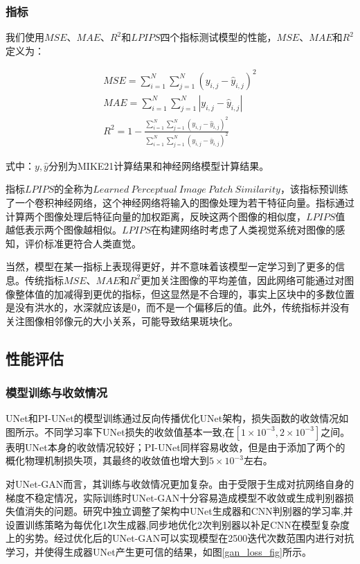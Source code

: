 \documentclass[12pt, a4paper]{article}
\begin{document}
\subsubsection{指标}

我们使用$MSE$、$MAE$、$R^2$和$LPIPS$四个指标测试模型的性能，$MSE$、$MAE$和$R^2$定义为：

\begin{align}
MSE=\sum_{i=1}^{N}\sum_{j=1}^{N}(y_{i,j}-\hat{y}_{i,j})^2 \\
MAE=\sum_{i=1}^{N}\sum_{j=1}^{N}|y_{i,j}-\hat{y}_{i,j}| \\
R^2= 1-\frac{\sum_{i=1}^{N}\sum_{j=1}^{N}(y_{i,j}-\hat{y}_{i,j})^2}{\sum_{i=1}^{N}\sum_{j=1}^{N}(y_{i,j}-\overline{y}_{i,j})^2}
\end{align}

式中：$y,\hat{y}$分别为MIKE21计算结果和神经网络模型计算结果。

指标$LPIPS$的全称为$Learned\ Perceptual\ Image\ Patch\ Similarity$，该指标预训练了一个卷积神经网络，这个神经网络将输入的图像处理为若干特征向量。指标通过计算两个图像处理后特征向量的加权距离，反映这两个图像的相似度，$LPIPS$值越低表示两个图像越相似。$LPIPS$在构建网络时考虑了人类视觉系统对图像的感知，评价标准更符合人类直觉。

当然，模型在某一指标上表现得更好，并不意味着该模型一定学习到了更多的信息。传统指标$MSE$、$MAE$和$R^2$更加关注图像的平均差值，因此网络可能通过对图像整体值的加减得到更优的指标，但这显然是不合理的，事实上区块中的多数位置是没有洪水的，水深就应该是0，而不是一个偏移后的值。此外，传统指标并没有关注图像相邻像元的大小关系，可能导致结果斑块化。

\subsection{性能评估}

\subsubsection{模型训练与收敛情况}

UNet和PI-UNet的模型训练通过反向传播优化UNet架构，损失函数的收敛情况如图所示。不同学习率下UNet损失的收敛值基本一致,在$[1\times10^{-3}, 2\times10^{-3}]$之间。表明UNet本身的收敛情况较好；PI-UNet同样容易收敛，但是由于添加了两个的概化物理机制损失项，其最终的收敛值也增大到$5\times10^{-3}$左右。

对UNet-GAN而言，其训练与收敛情况更加复杂。由于受限于生成对抗网络自身的梯度不稳定情况，实际训练时UNet-GAN十分容易造成模型不收敛或生成判别器损失值消失的问题。研究中独立调整了架构中UNet生成器和CNN判别器的学习率,并设置训练策略为每优化1次生成器,同步地优化2次判别器以补足CNN在模型复杂度上的劣势。经过优化后的UNet-GAN可以实现模型在2500迭代次数范围内进行对抗学习，并使得生成器UNet产生更可信的结果，如图\ref{gan_loss_fig}所示。
\end{document}
